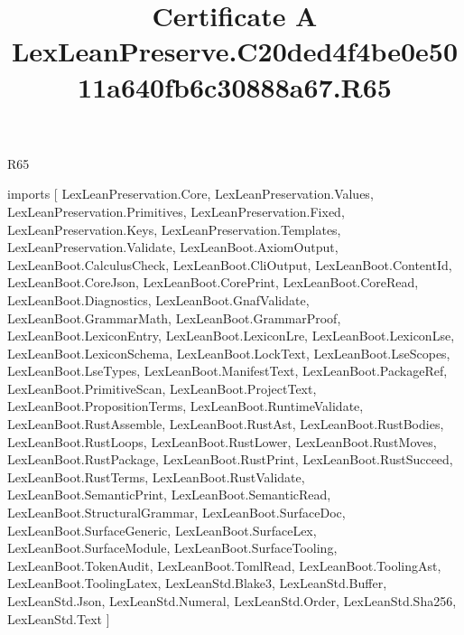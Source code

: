 \begin{lexlean}{R65}
\title{Certificate A LexLeanPreserve.C20ded4f4be0e5011a640fb6c30888a67.R65}
\begin{coremodule}
imports [
  LexLeanPreservation.Core,
  LexLeanPreservation.Values,
  LexLeanPreservation.Primitives,
  LexLeanPreservation.Fixed,
  LexLeanPreservation.Keys,
  LexLeanPreservation.Templates,
  LexLeanPreservation.Validate,
  LexLeanBoot.AxiomOutput,
  LexLeanBoot.CalculusCheck,
  LexLeanBoot.CliOutput,
  LexLeanBoot.ContentId,
  LexLeanBoot.CoreJson,
  LexLeanBoot.CorePrint,
  LexLeanBoot.CoreRead,
  LexLeanBoot.Diagnostics,
  LexLeanBoot.GnafValidate,
  LexLeanBoot.GrammarMath,
  LexLeanBoot.GrammarProof,
  LexLeanBoot.LexiconEntry,
  LexLeanBoot.LexiconLre,
  LexLeanBoot.LexiconLse,
  LexLeanBoot.LexiconSchema,
  LexLeanBoot.LockText,
  LexLeanBoot.LseScopes,
  LexLeanBoot.LseTypes,
  LexLeanBoot.ManifestText,
  LexLeanBoot.PackageRef,
  LexLeanBoot.PrimitiveScan,
  LexLeanBoot.ProjectText,
  LexLeanBoot.PropositionTerms,
  LexLeanBoot.RuntimeValidate,
  LexLeanBoot.RustAssemble,
  LexLeanBoot.RustAst,
  LexLeanBoot.RustBodies,
  LexLeanBoot.RustLoops,
  LexLeanBoot.RustLower,
  LexLeanBoot.RustMoves,
  LexLeanBoot.RustPackage,
  LexLeanBoot.RustPrint,
  LexLeanBoot.RustSucceed,
  LexLeanBoot.RustTerms,
  LexLeanBoot.RustValidate,
  LexLeanBoot.SemanticPrint,
  LexLeanBoot.SemanticRead,
  LexLeanBoot.StructuralGrammar,
  LexLeanBoot.SurfaceDoc,
  LexLeanBoot.SurfaceGeneric,
  LexLeanBoot.SurfaceLex,
  LexLeanBoot.SurfaceModule,
  LexLeanBoot.SurfaceTooling,
  LexLeanBoot.TokenAudit,
  LexLeanBoot.TomlRead,
  LexLeanBoot.ToolingAst,
  LexLeanBoot.ToolingLatex,
  LexLeanStd.Blake3,
  LexLeanStd.Buffer,
  LexLeanStd.Json,
  LexLeanStd.Numeral,
  LexLeanStd.Order,
  LexLeanStd.Sha256,
  LexLeanStd.Text
]


\end{coremodule}
\end{lexlean}
